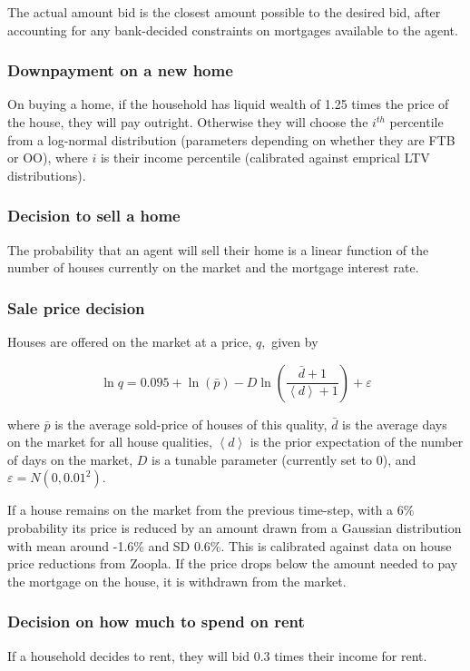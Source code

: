 \documentclass{article}
\begin{document}
The actual amount bid is the closest amount possible to the desired bid, after accounting for any bank-decided constraints on mortgages available to the agent.

\subsubsection{Downpayment on a new home}
On buying a home, if the household has liquid wealth of 1.25 times the price of the house, they will pay outright. Otherwise they will choose the $i^{th}$ percentile from a log-normal distribution (parameters depending on whether they are FTB or OO), where $i$ is their income percentile (calibrated against emprical LTV distributions).

\subsubsection{Decision to sell a home}
The probability that an agent will sell their home is a linear function of the number of houses currently on the market and the mortgage interest rate.

\subsubsection{Sale price decision}
Houses are offered on the market at a price, $q,$ given by

\begin{equation}
\ln q=0.095+\ln (\bar{p})-D\ln \left( \frac{\bar{d}+1}{\left\langle
d\right\rangle +1}\right) +\varepsilon
\end{equation}

\bigskip

where $\bar{p}$ is the average sold-price of houses of this quality, $\bar{d}
$ is the average days on the market for all house qualities, $\left\langle
d\right\rangle $ is the prior expectation of the number of days on the
market, $D$ is a tunable parameter (currently set to 0), and $\varepsilon
=N(0,0.01^{2})$.

If a house remains on the market from the previous time-step, with a 6\%
probability its price is reduced by an amount drawn from a Gaussian
distribution with mean around -1.6\% and SD 0.6\%. This is calibrated
against data on house price reductions from Zoopla. If the price drops below the amount needed to pay the mortgage on the house, it is withdrawn from the
market.

\subsubsection{Decision on how much to spend on rent}
If a household decides to rent, they will bid 0.3 times their income for rent.
\end{document}
